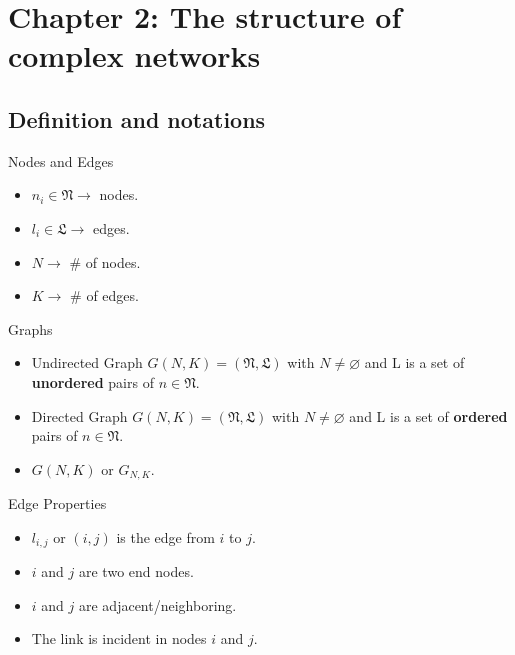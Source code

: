 \documentclass{beamer}
\begin{document}
\section{Chapter 2: The structure of complex networks}
\subsection{Definition and notations}

\begin{frame}{Nodes and Edges}
\begin{itemize}
 \item $n_i \in \mathfrak{N} \rightarrow$ nodes.
 \item $l_i \in \mathfrak{L} \rightarrow$ edges.
 \item $N \rightarrow$ \# of nodes.
 \item $K \rightarrow$ \# of edges.
\end{itemize}
\end{frame}


\begin{frame}{Graphs}
\begin{itemize}
 \item Undirected Graph $G(N, K) = (\mathfrak{N, L})$ with $N \neq \varnothing$ and L is a set of \textbf{unordered} pairs of $n \in \mathfrak{N}$.
 \item Directed Graph $G(N, K) = (\mathfrak{N, L})$ with $N \neq \varnothing$ and L is a set of \textbf{ordered} pairs of $n \in \mathfrak{N}$.
 \item $G(N,K)$ or $G_{N,K}$.
\end{itemize}
\end{frame}


\begin{frame}{Edge Properties}
\begin{center}
\end{center}

\begin{itemize}
 \item $l_{i,j}$ or $(i,j)$ is the edge from $i$ to $j$.
 \item $i$ and $j$ are two end nodes. 
 \item $i$ and $j$ are adjacent/neighboring.
 \item The link is incident in nodes $i$ and $j$.
\end{itemize}

\end{frame}
\end{document}
